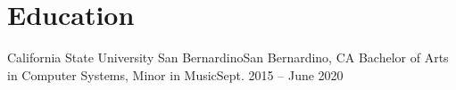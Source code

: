 \section{Education}
\resumeSubHeadingListStart
  \resumeEducation
    {California State University San Bernardino}{San Bernardino, CA}
    {Bachelor of Arts in Computer Systems, Minor in Music}{Sept. 2015 -- June 2020}
\resumeSubHeadingListEnd
